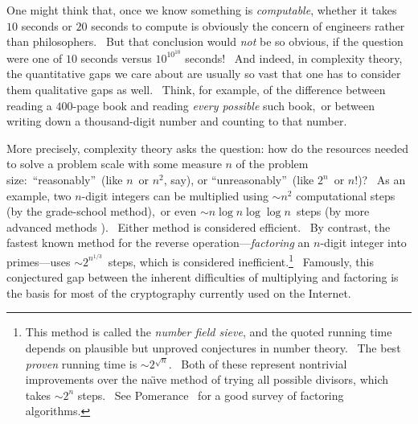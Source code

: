 \documentclass[11pt,onecolumn]{article}%
\begin{document}
One might think that, once we know something is \textit{computable}, whether
it takes $10$ seconds or $20$ seconds to compute is obviously the concern of
engineers rather than philosophers. \ But that conclusion would \textit{not}
be so obvious, if the question were one of $10$ seconds versus $10^{10^{10}}$
seconds! \ And indeed, in complexity theory, the quantitative gaps we care
about are usually so vast that one has to consider them qualitative gaps as
well. \ Think, for example, of the difference between reading a $400$-page
book and reading \textit{every possible} such book,\ or between writing down a
thousand-digit number and counting to that number.

More precisely, complexity theory asks the question: how do the resources
needed to solve a problem scale with some measure $n$ of the problem
size:\ \textquotedblleft reasonably\textquotedblright\ (like $n$\ or $n^{2}$,
say), or \textquotedblleft unreasonably\textquotedblright\ (like $2^{n}$\ or
$n!$)? \ As an example, two $n$-digit integers can be multiplied using $\sim
n^{2}$ computational steps (by the grade-school method),\ or even $\sim n\log
n\log\log n$\ steps (by more advanced methods \cite{schonhagestrassen}).
\ Either method is considered efficient. \ By contrast, the fastest known
method for the reverse operation---\textit{factoring} an $n$-digit integer
into primes---uses $\sim2^{n^{1/3}}$\ steps, which is considered
inefficient.\footnote{This method is called the \textit{number field sieve},
and the quoted running time depends on plausible but unproved conjectures in
number theory. \ The best \textit{proven} running time is $\sim2^{\sqrt{n}}$.
\ Both of these represent nontrivial improvements over the na\"{\i}ve method
of trying all possible divisors, which takes $\sim2^{n}$ steps. \ See
Pomerance \cite{pomerance}\ for a good survey of factoring algorithms.}
\ Famously, this conjectured gap between the inherent difficulties of
multiplying and factoring is the basis for most of the cryptography currently
used on the Internet.
\end{document}
